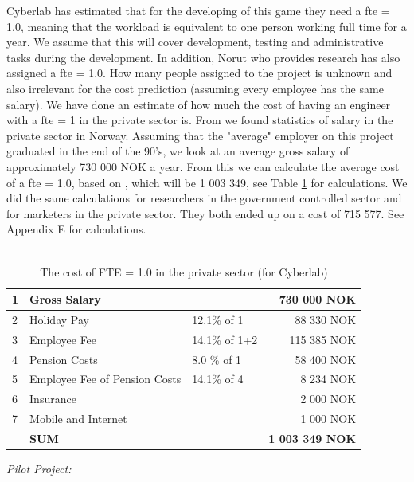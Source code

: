 Cyberlab has estimated that for the developing of this game they need a \ac{fte} = 1.0, meaning that the workload is equivalent to one person working full time for a year. We assume that this will cover development, testing and administrative tasks during the development. In addition, Norut who provides research has also assigned a \ac{fte} = 1.0. How many people assigned to the project is unknown and also irrelevant for the cost prediction (assuming every employee has the same salary). We have done an estimate of how much the cost of having an engineer with a \ac{fte} = 1 in the private sector is. From \cite{tekna} we found statistics of salary in the private sector in Norway. Assuming that the "average" employer on this project graduated in the end of the 90's, we look at an average gross salary of approximately 730 000 NOK a year. From this we can calculate the average cost of a \ac{fte} = 1.0, based on \cite{altinn}, which will be 1 003 349, see Table \ref{tab:costofFTE} for calculations. We did the same calculations for researchers in the government controlled sector and for marketers in the private sector. They both ended up on a cost of 715 577. See Appendix E for calculations.\\ \\
\begin{table}
\centering
    \caption[Cost of FTE = 1.0]{The cost of FTE = 1.0 in the private sector (for Cyberlab)}
    \begin{tabular}{|l|l|l|r|}
        \hline
       1&Gross Salary & & 730 000 NOK \\ \hline
       2&Holiday Pay & 12.1\% of 1  & 88 330 NOK \\ \hline
	   3&Employee Fee & 14.1\% of 1+2  & 115 385 NOK \\ \hline
	   4&Pension Costs & 8.0 \% of 1 & 58 400 NOK\\ \hline
	   5&Employee Fee of Pension Costs & 14.1\% of 4 & 8 234 NOK \\ \hline
	   6&Insurance & & 2 000 NOK \\ \hline
	   7&Mobile and Internet & & 1 000 NOK \\ \hline
	   & \textbf{SUM} & & \textbf{1 003 349 NOK} \\
	    \hline
    \end{tabular}
    \label{tab:costofFTE}
\end{table}
\emph{Pilot Project:}\\
